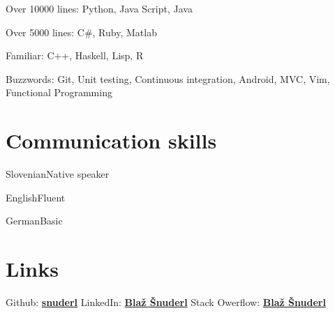 \documentclass{tccv}
\begin{document}
\begin{factlist}

\item{Over 10000 lines:}
     {Python, Java Script, Java}

\item{Over 5000 lines:}
     {C\#, Ruby, Matlab}
     
\item{Familiar:}
     {C++, Haskell, Lisp, R}

\item{Buzzwords:}
     {Git, Unit testing, Continuous integration, Android, MVC, Vim, Functional Programming}

\end{factlist}

\section{Communication skills}

\begin{factlist}
\item{Slovenian}{Native speaker}
\item{English}{Fluent}
\item{German}{Basic}
\end{factlist}

\section{Links} 
Github: \href{https://github.com/snuderl}{\textbf{snuderl}} \newline
LinkedIn:  \href{https://www.linkedin.com/pub/bla\%C5\%BE-\%C5\%A1nuderl/25/679/b84}{\textbf{Blaž Šnuderl}} \newline
Stack Owerflow: \href{http://stackoverflow.com/users/928489/bla\%C5\%BE-\%C5\%A1nuderl}{\textbf{Blaž Šnuderl}}
\end{document}
